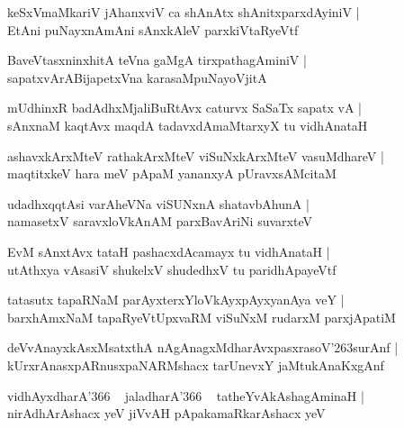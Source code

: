 \documentclass[twoside,12pt,openright]{book}
\def\S{\char'263}
\newcounter{shloka}[chapter]
\begin{document}
\begin{shloka}%
keSxVmaMkariV jAhanxviV ca shAnAtx shAnitxparxdAyiniV |\\
EtAni puNayxnAmAni sAnxkAleV parxkiVtaRyeVtf 
\end{shloka}

\begin{shloka}%
BaveVtasxninxhitA teVna gaMgA tirxpathagAminiV |\\
sapatxvArABijapetxVna karasaMpuNayoVjitA 
\end{shloka}

\begin{shloka}%
mUdhinxR badAdhxMjaliBuRtAvx caturvx SaSaTx sapatx vA |\\
sAnxnaM kaqtAvx maqdA tadavxdAmaMtarxyX tu vidhAnataH 
\end{shloka}

\begin{shloka}%
ashavxkArxMteV rathakArxMteV viSuNxkArxMteV vasuMdhareV |\\
maqtitxkeV hara meV pApaM yananxyA pUravxsAMcitaM 
\end{shloka}

\begin{shloka}%
udadhxqqtAsi varAheVNa viSUNxnA shatavbAhunA |\\
namasetxV saravxloVkAnAM parxBavAriNi suvarxteV
\end{shloka}

\begin{shloka}%
EvM sAnxtAvx tataH pashacxdAcamayx tu vidhAnataH |\\
utAthxya vAsasiV shukelxV shudedhxV tu paridhApayeVtf 
\end{shloka}

\begin{shloka}%
tatasutx tapaRNaM parAyxterxYloVkAyxpAyxyanAya veY |\\
barxhAmxNaM tapaRyeVtUpxvaRM viSuNxM rudarxM parxjApatiM 
\end{shloka}

\begin{shloka}%
deVvAnayxkAsxMsatxthA nAgAnagxMdharAvxpasxrasoV\S surAnf |\\
kUrxrAnasxpARnusxpaNARMshacx tarUnevxY jaMtukAnaKxgAnf 
\end{shloka}

\begin{shloka}%
vidhAyxdharA\char'366 ~ jaladharA\char'366 ~ tatheYvAkAshagAminaH |\\
nirAdhArAshacx yeV jiVvAH pApakamaRkarAshacx yeV 
\end{shloka}
\end{document}
